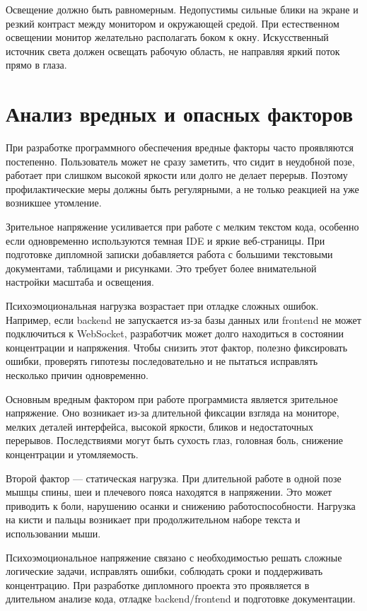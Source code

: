 Освещение должно быть равномерным. Недопустимы сильные блики на экране и резкий контраст между монитором и окружающей средой. При естественном освещении монитор желательно располагать боком к окну. Искусственный источник света должен освещать рабочую область, не направляя яркий поток прямо в глаза.


\section{Анализ вредных и опасных факторов}

При разработке программного обеспечения вредные факторы часто проявляются постепенно. Пользователь может не сразу заметить, что сидит в неудобной позе, работает при слишком высокой яркости или долго не делает перерыв. Поэтому профилактические меры должны быть регулярными, а не только реакцией на уже возникшее утомление.


Зрительное напряжение усиливается при работе с мелким текстом кода, особенно если одновременно используются темная IDE и яркие веб-страницы. При подготовке дипломной записки добавляется работа с большими текстовыми документами, таблицами и рисунками. Это требует более внимательной настройки масштаба и освещения.


Психоэмоциональная нагрузка возрастает при отладке сложных ошибок. Например, если backend не запускается из-за базы данных или frontend не может подключиться к WebSocket, разработчик может долго находиться в состоянии концентрации и напряжения. Чтобы снизить этот фактор, полезно фиксировать ошибки, проверять гипотезы последовательно и не пытаться исправлять несколько причин одновременно.


Основным вредным фактором при работе программиста является зрительное напряжение. Оно возникает из-за длительной фиксации взгляда на мониторе, мелких деталей интерфейса, высокой яркости, бликов и недостаточных перерывов. Последствиями могут быть сухость глаз, головная боль, снижение концентрации и утомляемость.


Второй фактор — статическая нагрузка. При длительной работе в одной позе мышцы спины, шеи и плечевого пояса находятся в напряжении. Это может приводить к боли, нарушению осанки и снижению работоспособности. Нагрузка на кисти и пальцы возникает при продолжительном наборе текста и использовании мыши.


Психоэмоциональное напряжение связано с необходимостью решать сложные логические задачи, исправлять ошибки, соблюдать сроки и поддерживать концентрацию. При разработке дипломного проекта это проявляется в длительном анализе кода, отладке backend/frontend и подготовке документации.


